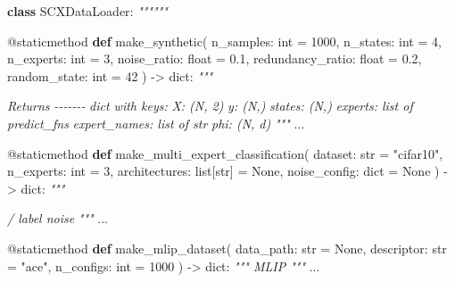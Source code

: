\documentclass[
  12pt,
]{article}
\newenvironment{Shaded}{}{}
\newcommand{\AttributeTok}[1]{\textcolor[rgb]{0.49,0.56,0.16}{#1}}
\newcommand{\BuiltInTok}[1]{\textcolor[rgb]{0.00,0.50,0.00}{#1}}
\newcommand{\CommentTok}[1]{\textcolor[rgb]{0.38,0.63,0.69}{\textit{#1}}}
\newcommand{\DecValTok}[1]{\textcolor[rgb]{0.25,0.63,0.44}{#1}}
\newcommand{\FloatTok}[1]{\textcolor[rgb]{0.25,0.63,0.44}{#1}}
\newcommand{\KeywordTok}[1]{\textcolor[rgb]{0.00,0.44,0.13}{\textbf{#1}}}
\newcommand{\NormalTok}[1]{#1}
\newcommand{\OperatorTok}[1]{\textcolor[rgb]{0.40,0.40,0.40}{#1}}
\newcommand{\StringTok}[1]{\textcolor[rgb]{0.25,0.44,0.63}{#1}}
\newcommand{\VariableTok}[1]{\textcolor[rgb]{0.10,0.09,0.49}{#1}}
\begin{document}
\begin{Shaded}
\begin{Highlighting}[]
\KeywordTok{class}\NormalTok{ SCXDataLoader:}
    \CommentTok{""""""}

    \AttributeTok{@staticmethod}
    \KeywordTok{def}\NormalTok{ make\_synthetic(}
\NormalTok{        n\_samples: }\BuiltInTok{int} \OperatorTok{=} \DecValTok{1000}\NormalTok{,}
\NormalTok{        n\_states: }\BuiltInTok{int} \OperatorTok{=} \DecValTok{4}\NormalTok{,}
\NormalTok{        n\_experts: }\BuiltInTok{int} \OperatorTok{=} \DecValTok{3}\NormalTok{,}
\NormalTok{        noise\_ratio: }\BuiltInTok{float} \OperatorTok{=} \FloatTok{0.1}\NormalTok{,}
\NormalTok{        redundancy\_ratio: }\BuiltInTok{float} \OperatorTok{=} \FloatTok{0.2}\NormalTok{,}
\NormalTok{        random\_state: }\BuiltInTok{int} \OperatorTok{=} \DecValTok{42}
\NormalTok{    ) }\OperatorTok{{-}\textgreater{}} \BuiltInTok{dict}\NormalTok{:}
        \CommentTok{"""}

\CommentTok{        Returns}
\CommentTok{        {-}{-}{-}{-}{-}{-}{-}}
\CommentTok{        dict with keys:}
\CommentTok{            X: (N, 2) }
\CommentTok{            y: (N,)   }
\CommentTok{            states: (N,) }
\CommentTok{            experts: list of predict\_fns}
\CommentTok{            expert\_names: list of str}
\CommentTok{            phi: (N, d) }
\CommentTok{        """}
\NormalTok{        ...}

    \AttributeTok{@staticmethod}
    \KeywordTok{def}\NormalTok{ make\_multi\_expert\_classification(}
\NormalTok{        dataset: }\BuiltInTok{str} \OperatorTok{=} \StringTok{"cifar10"}\NormalTok{,}
\NormalTok{        n\_experts: }\BuiltInTok{int} \OperatorTok{=} \DecValTok{3}\NormalTok{,}
\NormalTok{        architectures: }\BuiltInTok{list}\NormalTok{[}\BuiltInTok{str}\NormalTok{] }\OperatorTok{=} \VariableTok{None}\NormalTok{,}
\NormalTok{        noise\_config: }\BuiltInTok{dict} \OperatorTok{=} \VariableTok{None}
\NormalTok{    ) }\OperatorTok{{-}\textgreater{}} \BuiltInTok{dict}\NormalTok{:}
        \CommentTok{"""}

\CommentTok{        / label noise}
\CommentTok{        """}
\NormalTok{        ...}

    \AttributeTok{@staticmethod}
    \KeywordTok{def}\NormalTok{ make\_mlip\_dataset(}
\NormalTok{        data\_path: }\BuiltInTok{str} \OperatorTok{=} \VariableTok{None}\NormalTok{,}
\NormalTok{        descriptor: }\BuiltInTok{str} \OperatorTok{=} \StringTok{"ace"}\NormalTok{,}
\NormalTok{        n\_configs: }\BuiltInTok{int} \OperatorTok{=} \DecValTok{1000}
\NormalTok{    ) }\OperatorTok{{-}\textgreater{}} \BuiltInTok{dict}\NormalTok{:}
        \CommentTok{""" MLIP """}
\NormalTok{        ...}


\end{Highlighting}
\end{Shaded}
\end{document}
